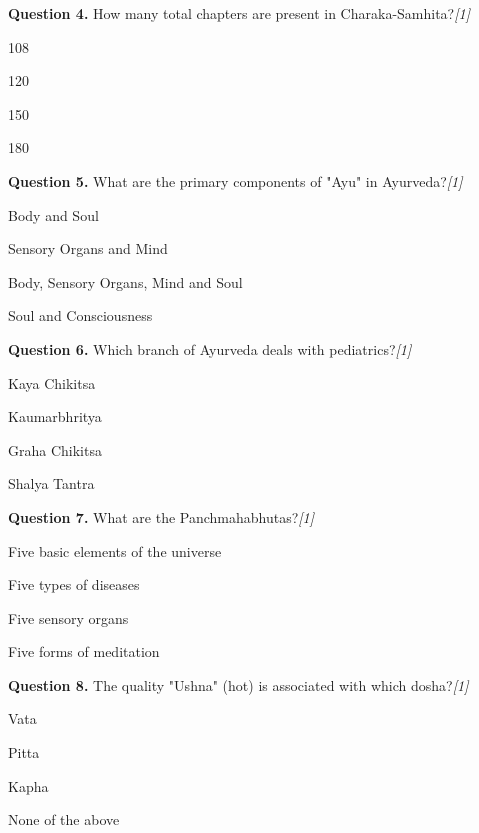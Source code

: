 \documentclass[11pt,a4paper]{article}
\newcommand{\pts}[1]{\hfill   \textit{[#1]}}
\begin{document}
\medskip


\noindent   \textbf{Question 4.} How many total chapters are present in Charaka-Samhita?\pts{1}

\begin{parts}
  \item 108
  \item 120
  \item 150
  \item 180
\end{parts}

\medskip


\noindent   \textbf{Question 5.} What are the primary components of "Ayu" in Ayurveda?\pts{1}

\begin{parts}
  \item Body and Soul
  \item Sensory Organs and Mind
  \item Body, Sensory Organs, Mind and Soul
  \item Soul and Consciousness
\end{parts}

\medskip


\noindent   \textbf{Question 6.} Which branch of Ayurveda deals with pediatrics?\pts{1}

\begin{parts}
  \item Kaya Chikitsa
  \item Kaumarbhritya
  \item Graha Chikitsa
  \item Shalya Tantra
\end{parts}

\medskip


\noindent   \textbf{Question 7.} What are the Panchmahabhutas?\pts{1}

\begin{parts}
  \item Five basic elements of the universe
  \item Five types of diseases
  \item Five sensory organs
  \item Five forms of meditation
\end{parts}

\medskip


\noindent   \textbf{Question 8.} The quality "Ushna" (hot) is associated with which dosha?\pts{1}

\begin{parts}
  \item Vata
  \item Pitta
  \item Kapha
  \item None of the above
\end{parts}
\end{document}
